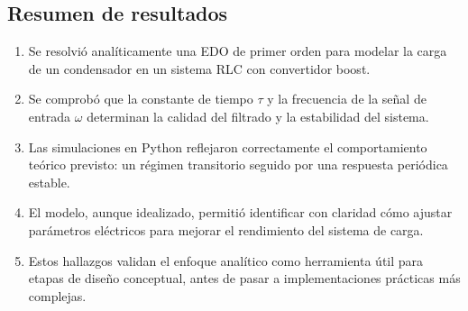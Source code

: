 \subsection{Resumen de resultados}
\begin{enumerate}[label=\Roman*.]
	\item Se resolvió analíticamente una EDO de primer orden para modelar la carga de un condensador en un sistema RLC con convertidor boost.

	\item Se comprobó que la constante de tiempo $\tau$ y la frecuencia de la señal de entrada $\omega$ determinan la calidad del filtrado y la estabilidad del sistema.

	\item Las simulaciones en Python reflejaron correctamente el comportamiento teórico previsto: un régimen transitorio seguido por una respuesta periódica estable.

	\item El modelo, aunque idealizado, permitió identificar con claridad cómo ajustar parámetros eléctricos para mejorar el rendimiento del sistema de carga.

	\item Estos hallazgos validan el enfoque analítico como herramienta útil para etapas de diseño conceptual, antes de pasar a implementaciones prácticas más complejas.
\end{enumerate}

